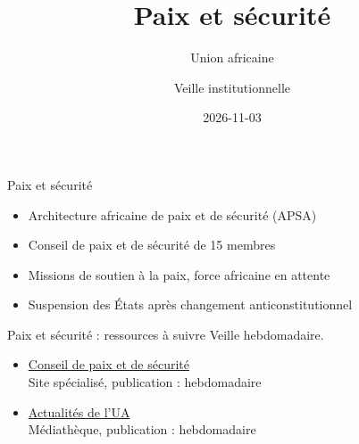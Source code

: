 \documentclass[aspectratio=169,11pt]{beamer}
\title{Paix et sécurité}
\subtitle{Union africaine}
\author{Veille institutionnelle}
\date{2026-11-03}
\begin{document}
\begin{frame}\titlepage\end{frame}

\begin{frame}{Paix et sécurité}
\begin{itemize}
\item Architecture africaine de paix et de sécurité (APSA)
\item Conseil de paix et de sécurité de 15 membres
\item Missions de soutien à la paix, force africaine en attente
\item Suspension des États après changement anticonstitutionnel
\end{itemize}
\end{frame}

\begin{frame}{Paix et sécurité : ressources à suivre}
\small
Veille hebdomadaire.
\begin{itemize}
\item \href{https://www.peaceau.org}{Conseil de paix et de sécurité}\\{\footnotesize Site spécialisé, publication : hebdomadaire}
\item \href{https://au.int/en/pressreleases}{Actualités de l'UA}\\{\footnotesize Médiathèque, publication : hebdomadaire}
\end{itemize}
\end{frame}
\end{document}
